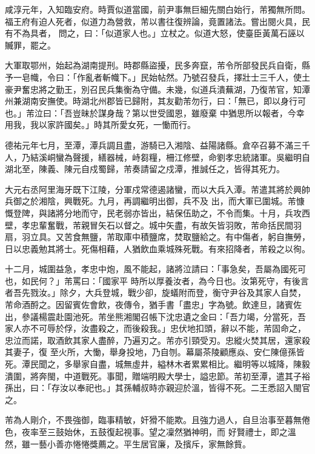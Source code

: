 \begin{pinyinscope}
 咸淳元年，入知臨安府。時賈似道當國，前尹事無巨細先關白始行，芾獨無所問。福王府有迫人死者，似道力為營救，芾以書往復辨論，竟置諸法。嘗出閱火具，民有不為具者，
 問之，曰：「似道家人也。」立杖之。似道大怒，使臺臣黃萬石誣以贓罪，罷之。



 大軍取鄂州，始起為湖南提刑。時郡縣盜擾，民多奔竄，芾令所部發民兵自衛，縣予一皂幟，令曰：「作亂者斬幟下。」民始帖然。乃號召發兵，擇壯士三千人，使土豪尹奮忠將之勤王，別召民兵集衡為守備。未幾，似道兵潰蕪湖，乃復芾官，知潭州兼湖南安撫使。時湖北州郡皆已歸附，其友勸芾勿行，曰：「無已，即以身行可也。」芾泣曰：「吾豈昧於謀身哉？第以世受國恩，雖廢棄
 中猶思所以報者，今幸用我，我以家許國矣。」時其所愛女死，一慟而行。



 德祐元年七月，至潭，潭兵調且盡，游騎已入湘陰、益陽諸縣。倉卒召募不滿三千人，乃結溪峒蠻為聲援，繕器械，峙芻糧，柵江修壁，命劉孝忠統諸軍。吳繼明自湖北至，陳義、陳元自戍蜀歸，芾奏請留之戍潭，推誠任之，皆得其死力。



 大元右丞阿里海牙既下江陵，分軍戍常德遏諸蠻，而以大兵入潭。芾遣其將於興帥兵御之於湘陰，興戰死。九月，再調繼明出御，兵不及
 出，而大軍已圍城。芾慷慨登陴，與諸將分地而守，民老弱亦皆出，結保伍助之，不令而集。十月，兵攻西壁，孝忠輩奮戰，芾親冒矢石以督之。城中矢盡，有故矢皆羽敗，芾命括民間羽扇，羽立具。又苦食無鹽，芾取庫中積鹽席，焚取鹽給之。有中傷者，躬自撫勞，日以忠義勉其將士。死傷相藉，人猶飲血乘城殊死戰。有來招降者，芾殺之以徇。



 十二月，城圍益急，孝忠中炮，風不能起，諸將泣請曰：「事急矣，吾屬為國死可也，如民何？」芾罵曰：「國家平
 時所以厚養汝者，為今日也。汝第死守，有後言者吾先戮汝。」除夕，大兵登城，戰少卻，旋蟻附而登，衡守尹谷及其家人自焚，芾命酒酹之。因留賓佐會飲，夜傳令，猶手書「盡忠」字為號。飲達旦，諸賓佐出，參議楊震赴園池死。芾坐熊湘閣召帳下沈忠遺之金曰：「吾力竭，分當死，吾家人亦不可辱於俘，汝盡殺之，而後殺我。」忠伏地扣頭，辭以不能，芾固命之，忠泣而諾，取酒飲其家人盡醉，乃遍刃之。芾亦引頸受刃。忠縱火焚其居，還家殺其妻子，復
 至火所，大慟，舉身投地，乃自刎。幕屬茶陵顧應焱、安仁陳億孫皆死。潭民聞之，多舉家自盡，城無虛井，縊林木者累累相比。繼明等以城降，陳毅潰圍，將奔閩，中道戰死。事聞，贈端明殿大學士，謚忠節。芾初至潭，遣其子裕孫出，曰：「存汝以奉祀也。」其孫輔叔時亦親迎於溫，皆得不死。二王悉詔入閩官之。



 芾為人剛介，不畏強御，臨事精敏，奸猾不能欺。且強力過人，自旦治事至暮無倦色，夜率至三鼓始休，五鼓復起視事。望之凜然猶神明，而
 好賢禮士，即之溫然，雖一藝小善亦惓惓獎薦之。平生居官廉，及擯斥，家無餘貲。




\end{pinyinscope}
